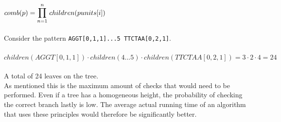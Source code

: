 \documentclass[12pt]{article}
\begin{document}
$comb(p)=\mathlarger{\mathlarger{\prod}_{n=1}^{n}\;children(punits[i])}$ \\ \\
Consider the pattern \texttt{AGGT[0,1,1]...5\; TTCTAA[0,2,1]}. \\ \\
$children(AGGT[0,1,1]) \cdot children(4...5) \cdot children(TTCTAA[0,2,1])=3\cdot 2\cdot 4=24$ \\ \\
A total of 24 leaves on the tree. \\
As mentioned this is the maximum amount of checks that would need to be performed. Even if a tree has a homogeneous 
height, the probability of checking the correct branch lastly is low.
The average actual running time of an algorithm that uses these principles would therefore be significantly better.
\end{document}
